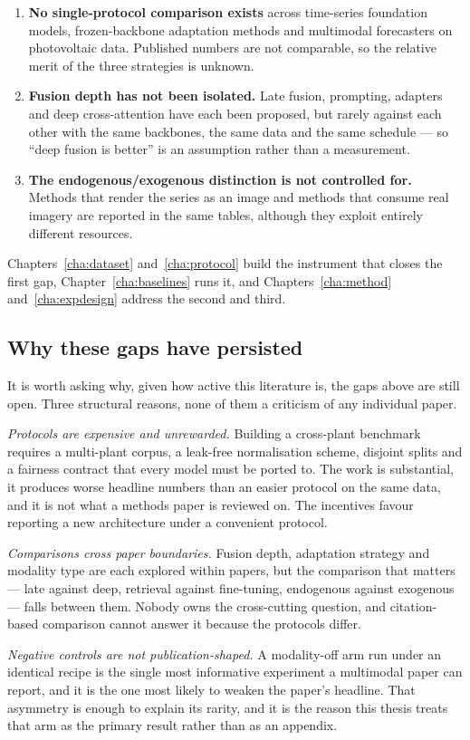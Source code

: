 \begin{enumerate}
  \item \textbf{No single-protocol comparison exists} across time-series foundation models,
    frozen-backbone adaptation methods and multimodal forecasters on photovoltaic data.
    Published numbers are not comparable, so the relative merit of the three strategies is
    unknown.
  \item \textbf{Fusion depth has not been isolated.} Late fusion, prompting, adapters and
    deep cross-attention have each been proposed, but rarely against each other with the
    same backbones, the same data and the same schedule --- so ``deep fusion is better'' is
    an assumption rather than a measurement.
  \item \textbf{The endogenous/exogenous distinction is not controlled for.} Methods that
    render the series as an image and methods that consume real imagery are reported in the
    same tables, although they exploit entirely different resources.
\end{enumerate}

Chapters~\ref{cha:dataset} and~\ref{cha:protocol} build the instrument that closes the
first gap, Chapter~\ref{cha:baselines} runs it, and Chapters~\ref{cha:method}
and~\ref{cha:expdesign} address the second and third.

\subsection{Why these gaps have persisted}

It is worth asking why, given how active this literature is, the gaps above are still open.
Three structural reasons, none of them a criticism of any individual paper.

\emph{Protocols are expensive and unrewarded.} Building a cross-plant benchmark requires a
multi-plant corpus, a leak-free normalisation scheme, disjoint splits and a fairness contract
that every model must be ported to. The work is substantial, it produces worse headline
numbers than an easier protocol on the same data, and it is not what a methods paper is
reviewed on. The incentives favour reporting a new architecture under a convenient protocol.

\emph{Comparisons cross paper boundaries.} Fusion depth, adaptation strategy and modality
type are each explored within papers, but the comparison that matters --- late against deep,
retrieval against fine-tuning, endogenous against exogenous --- falls between them. Nobody
owns the cross-cutting question, and citation-based comparison cannot answer it because the
protocols differ.

\emph{Negative controls are not publication-shaped.} A modality-off arm run under an
identical recipe is the single most informative experiment a multimodal paper can report, and
it is the one most likely to weaken the paper's headline. That asymmetry is enough to explain
its rarity, and it is the reason this thesis treats that arm as the primary result rather than
as an appendix.

\par

